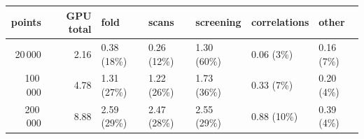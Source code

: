 \begin{tabular}{rrlllll}
\toprule
points & GPU total & fold & scans & screening & correlations & other \\
\midrule
20\,000 & 2.16 & 0.38 (18\%) & 0.26 (12\%) & 1.30 (60\%) & 0.06 (3\%) & 0.16 (7\%) \\
100\,000 & 4.78 & 1.31 (27\%) & 1.22 (26\%) & 1.73 (36\%) & 0.33 (7\%) & 0.20 (4\%) \\
200\,000 & 8.88 & 2.59 (29\%) & 2.47 (28\%) & 2.55 (29\%) & 0.88 (10\%) & 0.39 (4\%) \\
\bottomrule
\end{tabular}
